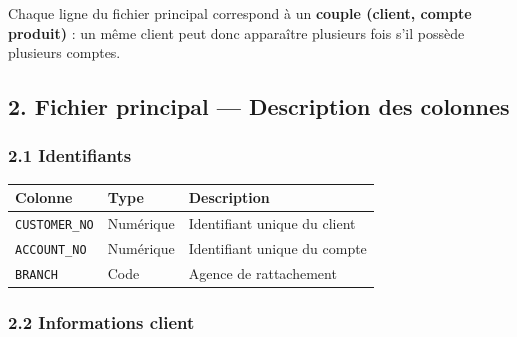 \documentclass[11pt,a4paper]{article}
\begin{document}
Chaque ligne du fichier principal correspond à un \textbf{couple
(client, compte produit)} : un même client peut donc apparaître
plusieurs fois s'il possède plusieurs comptes.

\subsection{2. Fichier principal --- Description des
colonnes}\label{fichier-principal-description-des-colonnes}

\subsubsection{2.1 Identifiants}\label{identifiants}

{\def\LTcaptype{none} %
\begin{longtable}[]{@{}lll@{}}
\toprule\noalign{}
Colonne & Type & Description \\
\midrule\noalign{}
\endhead
\bottomrule\noalign{}
\endlastfoot
\texttt{CUSTOMER\_NO} & Numérique & Identifiant unique du client \\
\texttt{ACCOUNT\_NO} & Numérique & Identifiant unique du compte \\
\texttt{BRANCH} & Code & Agence de rattachement \\
\end{longtable}
}

\subsubsection{2.2 Informations client}\label{informations-client}
\end{document}
